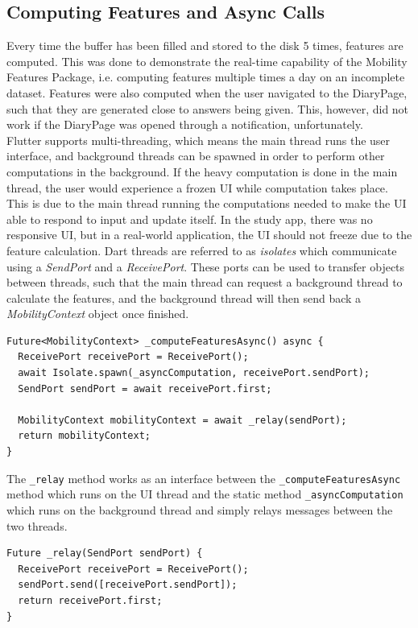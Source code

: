 \subsection{Computing Features and Async Calls}
Every time the buffer has been filled and stored to the disk 5 times, features are computed. This was done to demonstrate the real-time capability of the Mobility Features Package, i.e. computing features multiple times a day on an incomplete dataset. Features were also computed when the user navigated to the DiaryPage, such that they are generated close to answers being given. This, however, did not work if the DiaryPage was opened through a notification, unfortunately.\\

Flutter supports multi-threading, which means the main thread runs the user interface, and background threads can be spawned in order to perform other computations in the background. If the heavy computation is done in the main thread, the user would experience a frozen UI while computation takes place. This is due to the main thread running the computations needed to make the UI able to respond to input and update itself. In the study app, there was no responsive UI, but in a real-world application, the UI should not freeze due to the feature calculation. Dart threads are referred to as \textit{isolates} which communicate using a \textit{SendPort} and a \textit{ReceivePort}. These ports can be used to transfer objects between threads, such that the main thread can request a background thread to calculate the features, and the background thread will then send back a \textit{MobilityContext} object once finished. 

\begin{verbatim}
Future<MobilityContext> _computeFeaturesAsync() async {
  ReceivePort receivePort = ReceivePort();
  await Isolate.spawn(_asyncComputation, receivePort.sendPort);
  SendPort sendPort = await receivePort.first;

  MobilityContext mobilityContext = await _relay(sendPort);
  return mobilityContext;
}
\end{verbatim}

The \verb|_relay| method works as an interface between the \verb|_computeFeaturesAsync| method which runs on the UI thread and the static method \verb|_asyncComputation| which runs on the background thread and simply relays messages between the two threads.

\begin{verbatim}
Future _relay(SendPort sendPort) {
  ReceivePort receivePort = ReceivePort();
  sendPort.send([receivePort.sendPort]);
  return receivePort.first;
}
\end{verbatim}


